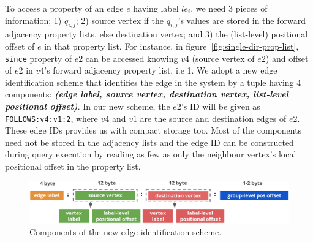 To access a property of an edge $e$ having label $le_i$, we need 3 pieces of information; 1) $q_{i,j}$; 2) source vertex if the $q_{i,j}$'s values are stored in the forward adjacency property lists, else destination vertex; and 3) the (list-level) positional offset of $e$ in that property list. For instance, in figure~\ref{fig:single-dir-prop-list}, \texttt{since} property of $e2$ can be accessed knowing $v4$ (source vertex of $e2$) and offset of $e2$ in $v4$'s forward adjacency property list, i.e 1. We adopt a new edge identification scheme that identifies the edge in the system by a tuple having 4 components: \textbf{\emph{(edge label, source vertex, destination vertex, list-level positional offset)}}. In our new scheme, the $e2$'s ID will be given as \texttt{FOLLOWS:v4:v1:2}, where $v4$ and $v1$ are the source and destination edges of $e2$. These edge IDs provides us with compact storage too. Most of the components need not be stored in the adjacency lists and the edge ID can be constructed during query execution by reading as few as only the neighbour vertex's local positional offset in the property list. 

\begin{figure}
	\hfill\includegraphics[scale=0.78]{img/edge-scheme}\hspace*{\fill}
	\captionsetup{justification=centering}
	\caption{Components of the new edge identification scheme. }
	\label{fig:edge-scheme}
\end{figure}

